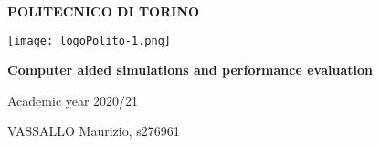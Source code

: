 \documentclass{report}
\begin{document}
\begin{titlepage}
   \begin{center}
       \LARGE
       \textbf{POLITECNICO DI TORINO}
       \vspace{1cm}
       
       \texttt{[image: logoPolito-1.png]}
       \vspace{0.8cm}
       
        \textbf{Computer aided simulations and performance evaluation}
       \vspace{1.5cm}
       
       Academic year 2020/21
       \vfill
       \begin{flushright}
       			\large
            VASSALLO Maurizio, s276961
       \end{flushright}
   \end{center}
\end{titlepage}

\tableofcontents
\end{document}
